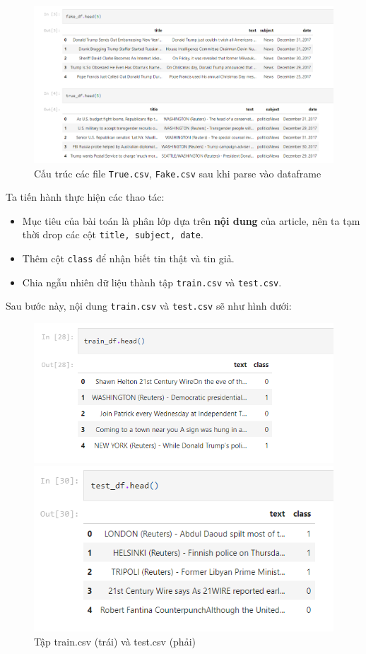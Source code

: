 \documentclass[12pt]{article}
\begin{document}
\begin{figure}[H]
	\centering
	\includegraphics[scale=.75]{img/quick-glance-at-data.PNG}
	\caption{Cấu trúc các file \texttt{True.csv}, \texttt{Fake.csv} sau khi parse vào dataframe}
\end{figure}
Ta tiến hành thực hiện các thao tác:
\begin{itemize}
\item Mục tiêu của bài toán là phân lớp dựa trên \textbf{nội dung} của article, nên ta tạm thời drop các cột \texttt{title, subject, date}.
\item Thêm cột \texttt{class} để nhận biết tin thật và tin giả.
\item Chia ngẫu nhiên dữ liệu thành tập \texttt{train.csv} và \texttt{test.csv}.
\end{itemize}
Sau bước này, nội dung \texttt{train.csv} và \texttt{test.csv} sẽ như hình dưới:
\begin{figure}[H]
\begin{multicols}{2}
\includegraphics[scale=.7]{img/train-csv.PNG}

\includegraphics[scale=.7]{img/test-csv.PNG}
\end{multicols}
\caption{Tập train.csv (trái) và test.csv (phải)}
\label{fig:trainandtestcsv}
\end{figure}
\end{document}
